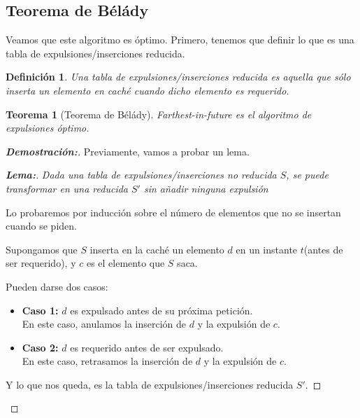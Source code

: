 \documentclass[a4paper, 11pt]{article} %
\newtheorem*{mydef}{Definición}
\newtheorem{theorem}{Teorema}
\begin{document}
  \subsection{Teorema de Bélády}
  Veamos que este algoritmo es óptimo.
  Primero, tenemos que definir lo que es una tabla de expulsiones/inserciones reducida.
  
  \begin{mydef}
    Una tabla de expulsiones/inserciones reducida es aquella que sólo inserta un elemento en caché cuando dicho elemento es requerido.
  \end{mydef}
  
  \begin{theorem}[Teorema de Bélády]
    Farthest-in-future es el algoritmo de expulsiones óptimo.
  \end{theorem}

  \begin{proof}[\textbf{Demostración:}]
  	Previamente, vamos a probar un lema.
  
	  \begin{proof}[\textbf{Lema:}]
	    \textit{
	      Dada una tabla de expulsiones/inserciones no reducida $S$, se puede transformar en una reducida $S'$ sin añadir ninguna expulsión  
	    }
	    
	    Lo probaremos por inducción sobre el número de elementos que no se insertan cuando se piden.
	    
	    Supongamos que $S$ inserta en la caché un elemento $d$ en un instante $t$(antes de ser requerido), y $c$
	    es el elemento que $S$ saca.
	    
	    Pueden darse dos casos:
	    \begin{itemize}
	      \item \textbf{Caso 1: } $d$ es expulsado antes de su próxima petición.\\
	      En este caso, anulamos la inserción de $d$ y la expulsión de $c$.
	      \item \textbf{Caso 2: } $d$ es requerido antes de ser expulsado. \\
	      En este caso, retrasamos la inserción de $d$ y la expulsión de $c$.
	    \end{itemize}
	    
	    Y lo que nos queda, es la tabla de expulsiones/inserciones reducida $S'$.
	  \end{proof}

  \end{proof}
  
\end{document}
